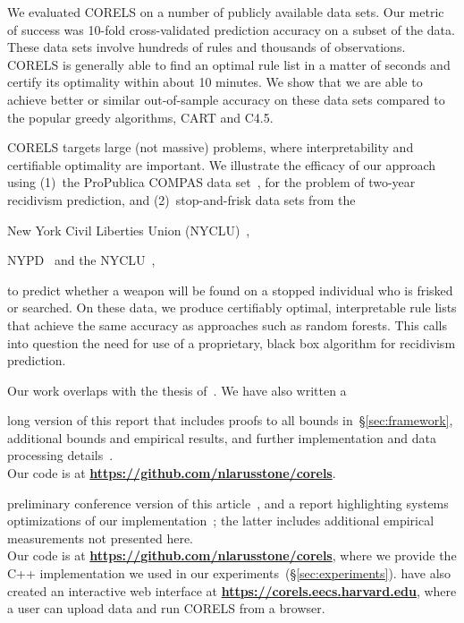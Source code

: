 \documentclass[twoside,11pt]{article}
\begin{document}
\begin{arxiv}
We evaluated CORELS on a number of publicly available data sets.
%
Our metric of success was 10-fold cross-validated prediction accuracy on a subset of the data.
%
These data sets involve hundreds of rules and thousands of observations.
%
CORELS is generally able to find an optimal rule list in a matter of seconds
and certify its optimality within about 10 minutes.
%
We show that we are able to achieve better or similar out-of-sample accuracy on these
data sets compared to the popular greedy algorithms, CART and C4.5.
\end{arxiv}

CORELS targets large (not massive) problems,
where interpretability and certifiable optimality are important.
%
We illustrate the efficacy of our approach using (1)~the ProPublica COMPAS data set~\citep{LarsonMaKiAn16}, for the problem of two-year recidivism prediction,
and (2)~stop-and-frisk data sets from the
\begin{kdd}
New York Civil Liberties Union (NYCLU)~\citep{nyclu:2014},
\end{kdd}
\begin{arxiv}
NYPD~\citep{nypd} and the NYCLU~\citep{nyclu:2014},
\end{arxiv}
to predict whether a weapon will be found
on a stopped individual who is frisked or searched.
%
On these data, we produce certifiably optimal, interpretable rule lists that achieve
the same accuracy as approaches such as random forests.
%
This calls into question the need for use of a proprietary,
black box algorithm for recidivism prediction.

Our work overlaps with the thesis of~\citet{Larus-Stone17}.
%
We have also written a
\begin{kdd}
long version of this report that includes proofs to all
bounds in~\S\ref{sec:framework}, additional bounds and empirical results,
and further implementation and data processing details~\citep{AngelinoLaAlSeRu17}. \\

Our code is at \textbf{\url{https://github.com/nlarusstone/corels}}.
\end{kdd}
\begin{arxiv}
preliminary conference version of this article~\citep{AngelinoLaAlSeRu17-kdd}, and a report
highlighting systems optimizations of our implementation~\citep{Larus-Stone18-sysml}; the latter includes
additional empirical measurements not presented here. \\

Our code is at \textbf{\url{https://github.com/nlarusstone/corels}},
where we provide the C++ implementation we used in our experiments~(\S\ref{sec:experiments}).
%
\citet{corels-website} have also created an interactive web interface at
\textbf{\url{https://corels.eecs.harvard.edu}}, where a user can upload data and
run CORELS from a browser.
\end{arxiv}
\end{document}

